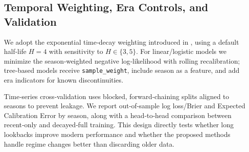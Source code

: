 \subsection{Temporal Weighting, Era Controls, and Validation}
We adopt the exponential time‑decay weighting introduced in , using a default half‑life $H=4$ with sensitivity to $H\in\{3,5\}$. For linear/logistic models we minimize the season‑weighted negative log‑likelihood with rolling recalibration; tree‑based models receive \texttt{sample\_weight}, include season as a feature, and add era indicators for known discontinuities.

Time‑series cross‑validation uses blocked, forward‑chaining splits aligned to seasons to prevent leakage. We report out‑of‑sample log loss/Brier and Expected Calibration Error by season, along with a head‑to‑head comparison between recent‑only and decayed‑full training. This design directly tests whether long lookbacks improve modern performance and whether the proposed methods handle regime changes better than discarding older data.



